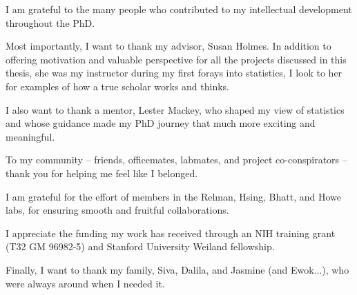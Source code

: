 
I am grateful to the many people who contributed to my intellectual development
throughout the PhD.

Most importantly, I want to thank my advisor, Susan Holmes. In addition to
offering motivation and valuable perspective for all the projects discussed in
this thesis, she was my instructor during my first forays into statistics, I
look to her for examples of how a true scholar works and thinks.

I also want to thank a mentor, Lester Mackey, who shaped my view of statistics
and whose guidance made my PhD journey that much more exciting and meaningful.

To my community -- friends, officemates, labmates, and project co-conspirators
-- thank you for helping me feel like I belonged.

I am grateful for the effort of members in the Relman, Hsing, Bhatt, and Howe
labs, for ensuring smooth and fruitful collaborations.

I appreciate the funding my work has received through an NIH training grant (T32
GM 96982-5) and Stanford University Weiland fellowship.

Finally, I want to thank my family, Siva, Dalila, and Jasmine (and Ewok...), who
were always around when I needed it.
